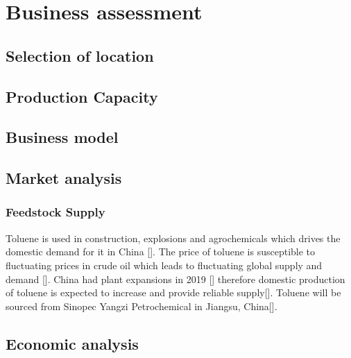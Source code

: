 \section{Business assessment}
\label{sec:economics}
\subsection{Selection of location} 




\subsection{Production Capacity}


\subsection{Business model} 

\subsection{Market analysis}

\subsubsection{Feedstock Supply}
Toluene is used in construction, explosions and agrochemicals which drives the domestic demand for it in China []. The price of toluene is susceptible to fluctuating prices in crude oil which leads to fluctuating global supply and demand []. China had plant expansions in 2019 [] therefore domestic production of toluene is expected to increase and provide reliable supply[]. Toluene will be sourced from Sinopec Yangzi Petrochemical in Jiangsu, China[].




\subsection{Economic analysis} 